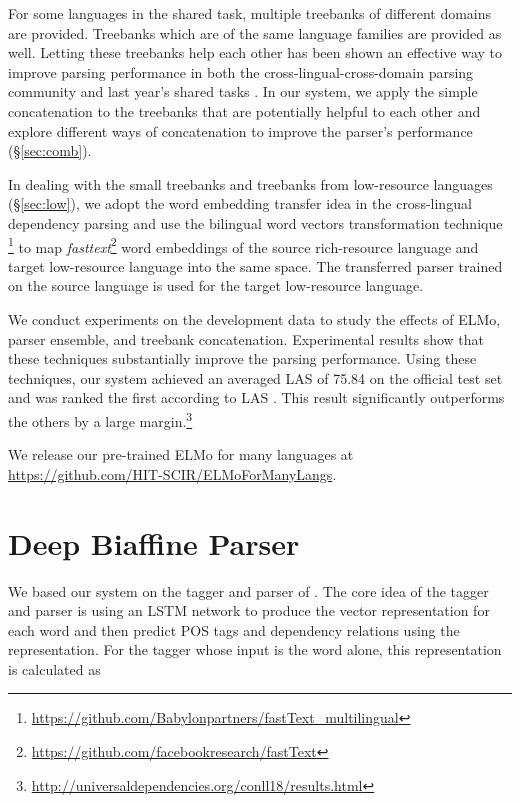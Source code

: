 \documentclass[11pt,a4paper]{article}
\begin{document}
For some languages in the shared task, multiple treebanks of different domains are provided.
Treebanks which are of the same language families are provided as well.
Letting these treebanks help each other has been shown an effective way to improve parsing performance
in both the cross-lingual-cross-domain parsing community and last year's shared tasks \cite{TACL892,guo-EtAl:2015:ACL-IJCNLP2,che-EtAl:2017:K17-3,shi-EtAl:2017:K17-3,bjorkelund-EtAl:2017:K17-3}.
In our system, we apply the simple concatenation to the treebanks that are potentially
helpful to each other
and explore different ways of concatenation to improve the parser's performance (\S\ref{sec:comb}).

In dealing with the small treebanks and treebanks from low-resource languages (\S\ref{sec:low}),
we adopt the word embedding transfer idea 
in the cross-lingual dependency parsing \cite{guo-EtAl:2015:ACL-IJCNLP2}
and use the bilingual word vectors transformation technique \cite{DBLP:journals/corr/SmithTHH17}\footnote{\url{https://github.com/Babylonpartners/fastText_multilingual}}
to map \textit{fasttext}\footnote{\url{https://github.com/facebookresearch/fastText}} word embeddings \cite{DBLP:journals/corr/BojanowskiGJM16}
of the source rich-resource language and target low-resource language
into the same space.
The transferred parser trained on the source language is used for the target low-resource language.

We conduct experiments on the development data to study
the effects of ELMo, parser ensemble, and treebank concatenation.
Experimental results show that these techniques substantially improve the parsing performance.
Using these techniques, our system achieved an averaged LAS of 75.84 on the official test set
and was ranked the first according to LAS \cite{udst:overview}.
This result significantly outperforms the others by a large margin.\footnote{\url{http://universaldependencies.org/conll18/results.html}}

We release our pre-trained ELMo for many languages at \url{https://github.com/HIT-SCIR/ELMoForManyLangs}.

\section{Deep Biaffine Parser}\label{sec:biaffine}

We based our system on the tagger and parser of \citet{dozat-qi-manning:2017:K17-3}.
The core idea of the tagger and parser
is using an LSTM network to produce the vector representation
for each word and then predict POS tags and dependency relations
using the representation.
For the tagger whose input is the word alone,
this representation is calculated as
\end{document}
